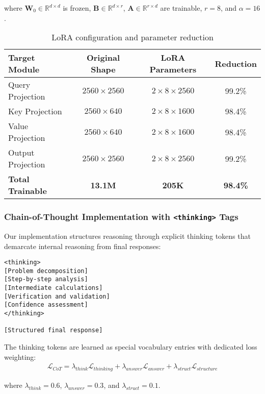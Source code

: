where $\mathbf{W}_0 \in \mathbb{R}^{d \times d}$ is frozen, $\mathbf{B} \in \mathbb{R}^{d \times r}$, $\mathbf{A} \in \mathbb{R}^{r \times d}$ are trainable, $r = 8$, and $\alpha = 16$.

\begin{table}[H]
\centering
\begin{tabular}{lccc}
\toprule
Target Module & Original Shape & LoRA Parameters & Reduction \\
\midrule
Query Projection & $2560 \times 2560$ & $2 \times 8 \times 2560$ & 99.2\% \\
Key Projection & $2560 \times 640$ & $2 \times 8 \times 1600$ & 98.4\% \\
Value Projection & $2560 \times 640$ & $2 \times 8 \times 1600$ & 98.4\% \\
Output Projection & $2560 \times 2560$ & $2 \times 8 \times 2560$ & 99.2\% \\
\midrule
\textbf{Total Trainable} & \textbf{13.1M} & \textbf{205K} & \textbf{98.4\%} \\
\bottomrule
\end{tabular}
\caption{LoRA configuration and parameter reduction}
\label{tab:lora-config}
\end{table}

\subsubsection{Chain-of-Thought Implementation with \texttt{<thinking>} Tags}
Our implementation structures reasoning through explicit thinking tokens that demarcate internal reasoning from final responses:

\begin{lstlisting}[caption=Chain-of-thought structure,label=lst:cot-structure]
<thinking>
[Problem decomposition]
[Step-by-step analysis]
[Intermediate calculations]
[Verification and validation]
[Confidence assessment]
</thinking>

[Structured final response]
\end{lstlisting}

The thinking tokens are learned as special vocabulary entries with dedicated loss weighting:
\begin{align}
\mathcal{L}_{CoT} = \lambda_{think} \mathcal{L}_{thinking} + \lambda_{answer} \mathcal{L}_{answer} + \lambda_{struct} \mathcal{L}_{structure}
\end{align}

where $\lambda_{think} = 0.6$, $\lambda_{answer} = 0.3$, and $\lambda_{struct} = 0.1$.

